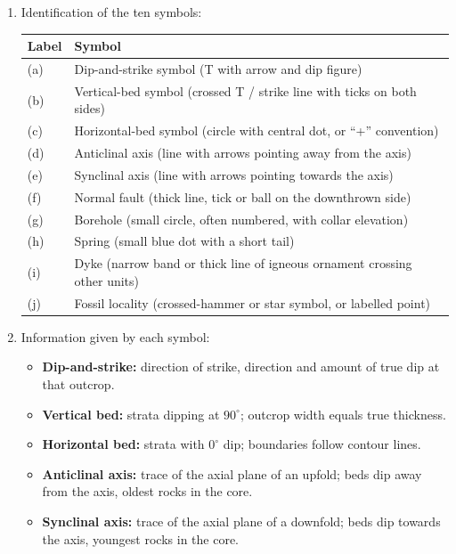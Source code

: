 \documentclass[11pt]{article}
\begin{document}
\begin{corrige}
\begin{enumerate}
\item Identification of the ten symbols:
\begin{center}
\begin{tabularx}{\linewidth}{|l|X|}
\hline
\rowcolor{popblueL} Label & Symbol \\
\hline
(a) & Dip-and-strike symbol (T with arrow and dip figure) \\
\hline
(b) & Vertical-bed symbol (crossed T / strike line with ticks on both sides) \\
\hline
(c) & Horizontal-bed symbol (circle with central dot, or ``+'' convention) \\
\hline
(d) & Anticlinal axis (line with arrows pointing away from the axis) \\
\hline
(e) & Synclinal axis (line with arrows pointing towards the axis) \\
\hline
(f) & Normal fault (thick line, tick or ball on the downthrown side) \\
\hline
(g) & Borehole (small circle, often numbered, with collar elevation) \\
\hline
(h) & Spring (small blue dot with a short tail) \\
\hline
(i) & Dyke (narrow band or thick line of igneous ornament crossing other units) \\
\hline
(j) & Fossil locality (crossed-hammer or star symbol, or labelled point) \\
\hline
\end{tabularx}
\end{center}
\item Information given by each symbol:
\begin{itemize}
\item \textbf{Dip-and-strike:} direction of strike, direction and amount of true dip at that outcrop.
\item \textbf{Vertical bed:} strata dipping at $90^{\circ}$; outcrop width equals true thickness.
\item \textbf{Horizontal bed:} strata with $0^{\circ}$ dip; boundaries follow contour lines.
\item \textbf{Anticlinal axis:} trace of the axial plane of an upfold; beds dip away from the axis, oldest rocks in the core.
\item \textbf{Synclinal axis:} trace of the axial plane of a downfold; beds dip towards the axis, youngest rocks in the core.

\end{itemize}
\end{enumerate}
\end{corrige}
\end{document}

